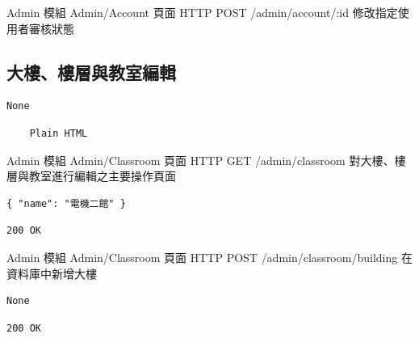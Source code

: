 \documentclass{article}
\begin{document}
{Admin 模組}
{Admin/Account 頁面}
{HTTP POST}
{/admin/account/:id}
{修改指定使用者審核狀態}

\pagebreak

\subsection{大樓、樓層與教室編輯}

\begin{lrbox}{\jsoninputbox}
	\begin{lstlisting}
None
\end{lstlisting}
\end{lrbox}

\begin{lrbox}{\jsonoutputbox}
	\begin{lstlisting}
	Plain HTML
\end{lstlisting}
\end{lrbox}

{Admin 模組}
{Admin/Classroom 頁面}
{HTTP GET}
{/admin/classroom}
{對大樓、樓層與教室進行編輯之主要操作頁面}

\bigskip

\begin{lrbox}{\jsoninputbox}
	\begin{lstlisting}[basicstyle=\footnotesize\ttfamily]
{ "name": "電機二館" }
\end{lstlisting}
\end{lrbox}

\begin{lrbox}{\jsonoutputbox}
	\begin{lstlisting}
200 OK
\end{lstlisting}
\end{lrbox}

{Admin 模組}
{Admin/Classroom 頁面}
{HTTP POST}
{/admin/classroom/building}
{在資料庫中新增大樓}

\bigskip

\begin{lrbox}{\jsoninputbox}
	\begin{lstlisting}
None
\end{lstlisting}
\end{lrbox}

\begin{lrbox}{\jsonoutputbox}
	\begin{lstlisting}
200 OK
\end{lstlisting}
\end{lrbox}
\end{document}
